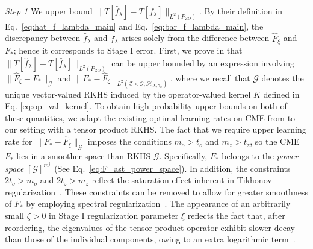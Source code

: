 \documentclass[11pt]{article}
\newcommand{\meffective}{m^{\dag}}
\newcommand{\calZ}{\mathcal{Z}}
\newcommand{\calG}{\mathcal{G}}
\newcommand{\calO}{\mathcal{O}}
\newcommand{\0}{\mathbf{0}}
\begin{document}
\textit{Step 1} We upper bound $\|T[\hat{f}_\lambda]-T[\bar{f}_\lambda]\|_{L^2\left(P_{Z O}\right)}$. By their definition in Eq.~\eqref{eq:hat_f_lambda_main} and Eq.~\eqref{eq:bar_f_lambda_main}, the discrepancy between $\hat{f}_\lambda$ and $\bar{f}_\lambda$ arises solely from the difference between $\hat{F}_{\xi}$ and $F_\ast$; hence it corresponds to Stage I error. First, we prove in  that $\|T[\hat{f}_\lambda]-T[\bar{f}_\lambda]\|_{L^2\left(P_{Z O}\right)}$ can be upper bounded by an expression involving $\|\hat{F}_{\xi}-F_*\|_{\calG}$ and $\|F_*-\hat{F}_{\xi}\|_{L^2(\calZ\times\calO; \mathcal{H}_{X,\gamma_x})}$, where we recall that $\calG$ denotes the unique vector-valued RKHS induced by
the operator-valued kernel $K$ defined in Eq. \eqref{eq:op_val_kernel}. 
To obtain high-probability upper bounds on both of these quantities, we adapt the existing optimal learning rates on CME from \citet{lietal2022optimal} to our setting with a tensor product RKHS. 
The fact that we require upper learning rate for $\|F_*-\hat{F}_{\xi}\|_{\calG}$ imposes the conditions $m_o>t_o$ and $m_z>t_z$, so the CME $F_\ast$ lies in a smoother space than RKHS $\calG$. Specifically, $F_{\ast}$ belongs to the \emph{power space} $[\calG]^{\meffective}$ (See Eq.~\eqref{eq:F_ast_power_space}).
In addition, the constraints $2 t_o>m_o$ and $2 t_z>m_z$ reflect the saturation effect inherent in Tikhonov regularization~\citep{bauer2007regularization, lu2024saturation, meunier2024optimalratesvectorvaluedspectral}. 
These constraints can be removed to allow for greater smoothness of $F_\ast$ by employing spectral regularization~\citep{meunier2024optimalratesvectorvaluedspectral}. 
The appearance of an arbitrarily small $\zeta>0$ in Stage I regularization parameter $\xi$ reflects the fact that, after reordering, the eigenvalues of the tensor product operator exhibit slower decay than those of the individual components, owing to an extra logarithmic term~\citep{krieg2018tensor}.
\end{document}
